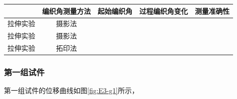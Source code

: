\begin{table}[!htb]
	\centering
	\label{tab:hose-specimen-II-2}
	\begin{tabular}{@{\extracolsep{\fill}}>{\hspace{0.5cm}}ccccc}
		\toprule
		& 编织角测量方法 &   起始编织角    &  过程编织角变化   &   测量准确性    \\ \midrule
		拉伸实验 &   摄影法   & \checkmark &            &  \\
		拉伸实验 &   摄影法   & \checkmark &            &  \\
		拉伸实验 &   拓印法   & \checkmark & \checkmark & \checkmark \\ \bottomrule
	\end{tabular} 
\end{table}


\subsubsection{第一组试件}

第一组试件的位移曲线如图\ref{fig:E3-g1}所示，

